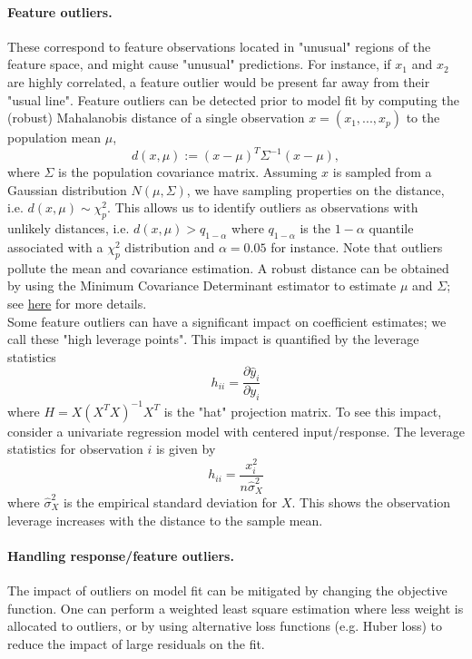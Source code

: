 \documentclass[]{article}
\begin{document}
\paragraph{Feature outliers.} These correspond to feature observations located in "unusual" regions of the feature space, and might cause "unusual" predictions. For instance, if $x_1$ and $x_2$ are highly correlated, a feature outlier would be present far away from their "usual line".  Feature outliers can be detected prior to model fit by computing the (robust) Mahalanobis distance of a single observation $x=(x_1,...,x_p)$ to the population mean $\mu$,
\begin{equation}
d(x,\mu):= (x-\mu)^T \Sigma^{-1} (x-\mu),
\end{equation}
where $\Sigma$ is the population covariance matrix. Assuming $x$ is sampled from a Gaussian distribution $N(\mu,\Sigma)$, we have sampling properties on the distance, i.e. $d(x,\mu)\sim\chi^2_p$. This allows us to identify outliers as observations with unlikely distances, i.e. $d(x,\mu)>q_{1-\alpha}$ where $q_{1-\alpha}$ is the $1-\alpha$ quantile associated with a $\chi^2_p$ distribution and $\alpha=0.05$ for instance. Note that outliers pollute the mean and covariance estimation. A robust distance can be obtained by using the Minimum Covariance Determinant estimator to estimate $\mu$ and $\Sigma$; see \href{https://scikit-learn.org/stable/auto_examples/covariance/plot_mahalanobis_distances.html#sphx-glr-auto-examples-covariance-plot-mahalanobis-distances-py}{here} for more details.\\

\noindent Some feature outliers can have a significant impact on coefficient estimates; we call these "high leverage points". This impact is quantified by the leverage statistics
\begin{equation}
h_{ii}=\frac{\partial \hat{y}_i}{\partial y_i}
\end{equation}
where $H=X(X^TX)^{-1}X^T$ is the "hat" projection matrix. To see this impact, consider a univariate regression model with centered input/response. The leverage statistics for observation $i$ is given by
\begin{equation}
h_{ii}=\frac{x_i^2}{n\hat{\sigma}_X^2}
\end{equation}
where $\hat{\sigma}_X^2$ is the empirical standard deviation for $X$. This shows the observation leverage increases with the distance to the sample mean.

\paragraph{Handling response/feature outliers.} The impact of outliers on model fit can be mitigated by changing the objective function. One can perform a weighted least square estimation where less weight is allocated to outliers, or by using alternative loss functions (e.g. Huber loss) to reduce the impact of large residuals on the fit.
\end{document}
